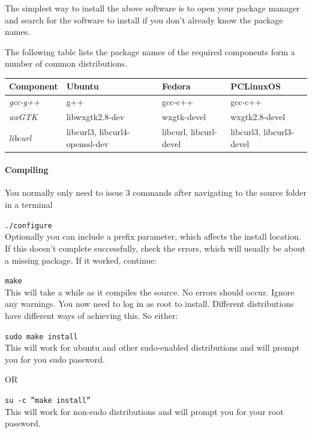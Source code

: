 The simplest way to install the above software is to open your package manager
and search for the software to install if you don't already know the package
names.

The following table lists the package names of the required components form a
number of common distributions.

\begin{center}
\begin{tabular}{l|l|l|l}
\textbf{Component}   & \textbf{Ubuntu}       & \textbf{Fedora}        &
\textbf{PCLinuxOS} \\
\hline
\textit{gcc-g++}     & g++                            & gcc-c++                &
gcc-c++ \\
\textit{wxGTK}       & libwxgtk2.8-dev                & wxgtk-devel            &
wxgtk2.8-devel \\
\textit{libcurl }    & libcurl3, libcurl4-openssl-dev & libcurl, libcurl-devel &
libcurl3, libcurl3-devel \\
\end{tabular}
\end{center}

\paragraph{Compiling}

You normally only need to issue 3 commands after navigating to the source folder
in a terminal

\texttt{./configure}\\
Optionally you can include a prefix parameter, which affects the install
location. If this doesn't complete successfully, check the errors, which will
usually be about a missing package. If it worked, continue:

\texttt{make}\\
This will take a while as it compiles the source. No errors should occur. Ignore
any warnings. You now need to log in as root to install. Different distributions
have different ways of achieving this. So either:

\texttt{sudo make install}\\
This will work for ubuntu and other sudo-enabled distributions and will prompt
you for you sudo password.

OR

\texttt{su -c \textquotedblright make install\textquotedblright}\\
This will work for non-sudo distributions and will prompt you for your root
password.

